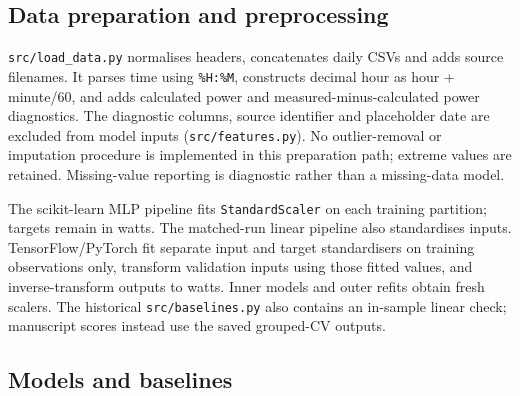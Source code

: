 \documentclass[10pt,journal,twoside]{IEEEtran}
\begin{document}
\subsection{Data preparation and preprocessing}


\texttt{src/load\_data.py} normalises headers, concatenates daily CSVs and adds source filenames.
It parses time using \texttt{\%H:\%M}, constructs decimal hour as hour + minute/60, and adds
calculated power and measured-minus-calculated power diagnostics. The diagnostic columns,
source identifier and placeholder date are excluded from model inputs (\texttt{src/features.py}).
No outlier-removal or imputation procedure is implemented in this preparation path; extreme
values are retained. Missing-value reporting is diagnostic rather than a missing-data model.

The scikit-learn MLP pipeline fits \texttt{StandardScaler} on each training partition; targets remain
in watts. The matched-run linear pipeline also standardises inputs. TensorFlow/PyTorch fit
separate input and target standardisers on training observations only, transform validation
inputs using those fitted values, and inverse-transform outputs to watts. Inner models and
outer refits obtain fresh scalers. The historical \texttt{src/baselines.py} also contains an in-sample
linear check; manuscript scores instead use the saved grouped-CV outputs.


\subsection{Models and baselines}
\end{document}
